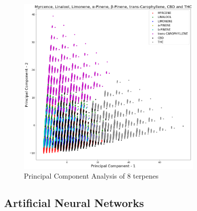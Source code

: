 \documentclass[12pt, a4paper]{article}
\begin{document}
\begin{figure}[!ht]
\centering
    \begin{center}
        \includegraphics[width=9cm]{2dPCA.png}
    \end{center}
    \caption{Principal Component Analysis of 8 terpenes}
    \label{fig:2dPCAfor8}
\end{figure}


\subsection{Artificial Neural Networks}
\end{document}
